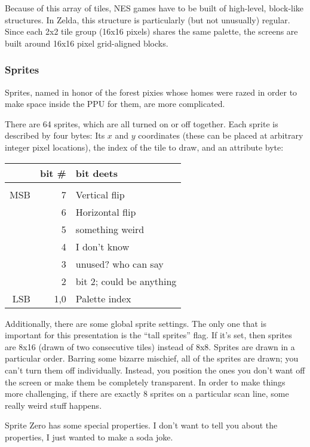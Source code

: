 \documentclass[twocolumn]{article}
\begin{document}
Because of this array of tiles, NES games have to be built of
high-level, block-like structures. In Zelda, this structure is
particularly (but not unusually) regular. Since each 2x2 tile group
(16x16 pixels) shares the same palette, the screens are built around
16x16 pixel grid-aligned blocks.

\subsubsection{Sprites} \label{sec:sprites}

Sprites, named in honor of the forest pixies whose homes were razed in
order to make space inside the PPU for them, are more complicated.

There are 64 sprites, which are all turned on or off together. Each
sprite is described by four bytes: Its $x$ and $y$ coordinates (these
can be placed at arbitrary integer pixel locations), the index of
the tile to draw, and an attribute byte:

\begin{tabular}{rrl}
    & bit \# & bit deets \\
\hline \\
MSB & 7      & Vertical flip \\
    & 6      & Horizontal flip \\
    & 5      & something weird \\
    & 4      & I don't know \\
    & 3      & unused? who can say \\
    & 2      & bit 2; could be anything \\
LSB & 1,0    & Palette index \\
\end{tabular}

Additionally, there are some global sprite settings. The only one that
is important for this presentation is the ``tall sprites'' flag. If
it's set, then sprites are 8x16 (drawn of two consecutive tiles)
instead of 8x8. Sprites are drawn in a particular order. Barring some
bizarre mischief, all of the sprites are drawn; you can't turn them
off individually. Instead, you position the ones you don't want off
the screen or make them be completely transparent. In order to make
things more challenging, if there are exactly 8 sprites on a
particular scan line, some really weird stuff happens. %

Sprite Zero has some special properties. I don't want to tell you
about the properties, I just wanted to make a soda joke.
\end{document}
